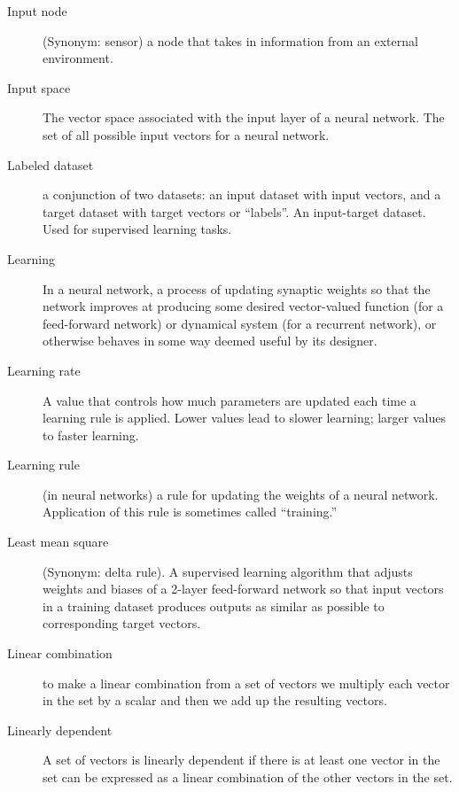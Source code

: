 \begin{description}
\item[Input node] (Synonym: sensor) a node that takes in information from an external environment. 

\item[Input space] The vector space associated with the input layer of a neural network. The set of all possible input vectors for a neural network.





\item[Labeled dataset] a conjunction of two datasets: an input dataset with input vectors, and a target dataset with target vectors or ``labels''. An input-target dataset. Used for supervised learning tasks.  

\item[Learning] In a neural network, a process of updating synaptic weights so that the network improves at producing some desired vector-valued function (for a feed-forward network) or dynamical system (for a recurrent network), or otherwise behaves in some way deemed useful by its designer.

\item[Learning rate] A value that controls how much parameters are updated each time a learning rule is applied. Lower values lead to slower learning; larger values to faster learning.

\item[Learning rule] (in neural networks) a rule for updating the weights of a neural network. Application of this rule is sometimes called ``training.''

\item[Least mean square] (Synonym: delta rule). A supervised learning algorithm that adjusts weights and biases of a 2-layer feed-forward network so that input vectors in a training dataset produces outputs as similar as possible to corresponding target vectors.

\item[Linear combination] to make a linear combination from a set of vectors we multiply each vector in the set by a scalar and then we add up the resulting vectors.

\item[Linearly dependent] A set of vectors is linearly dependent if there is at least one vector in the set can be expressed as a linear combination of the other vectors in the set.


\end{description}
